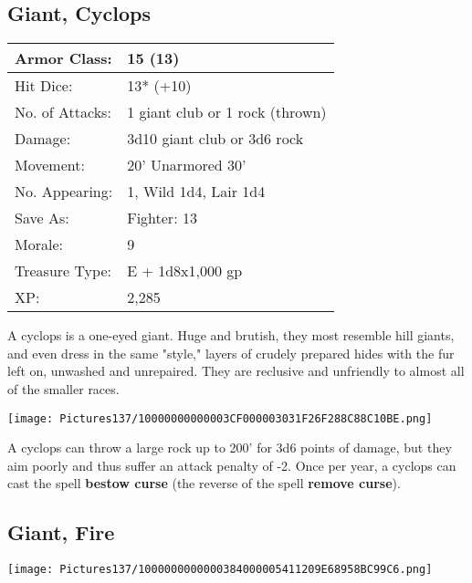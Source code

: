 \documentclass[a4paper,twoside,openany,10pt]{book}
\begin{document}
\begin{multicols}{2}
\subsection*{Giant, Cyclops}\label{giant-cyclops}

\begin{tabularx}{0.48\textwidth}{@{}lX@{}}
Armor Class: & 15 (13) \\\hline
Hit Dice: & 13* (+10) \\\hline
No. of Attacks: & 1 giant club or 1 rock (thrown) \\\hline
Damage: & 3d10 giant club or 3d6 rock \\\hline
Movement: & 20' Unarmored 30' \\\hline
No. Appearing: & 1, Wild 1d4, Lair 1d4 \\\hline
Save As: & Fighter: 13 \\\hline
Morale: & 9 \\\hline
Treasure Type: & E + 1d8x1,000 gp \\\hline
XP: & 2,285 \\\hline
\end{tabularx}\medskip

A cyclops is a one-eyed giant. Huge and brutish, they most resemble hill giants, and even dress in the same "style," layers of crudely prepared hides with the fur left on, unwashed and unrepaired. They are reclusive and unfriendly to almost all of the smaller races.

\begin{center}
	\texttt{[image: Pictures137/10000000000003CF000003031F26F288C88C10BE.png]}
\end{center}


A cyclops can throw a large rock up to 200' for 3d6 points of damage, but they aim poorly and thus suffer an attack penalty of -2. Once per year, a cyclops can cast the spell \textbf{bestow curse} (the reverse of the spell \textbf{remove curse}).


\subsection*{Giant, Fire}\label{giant-fire}


\texttt{[image: Pictures137/1000000000000384000005411209E68958BC99C6.png]}



\end{multicols}
\end{document}
